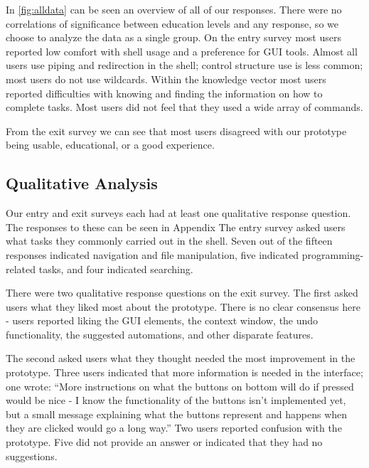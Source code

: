 In \ref{fig:alldata} can be seen an overview of all of our responses. There were no
correlations of significance between education levels and any response, so we
choose to analyze the data as a single group. On the entry survey most users
reported low comfort with shell usage and a preference for GUI tools. Almost all
users use piping and redirection in the shell; control structure use is less
common; most users do not use wildcards. Within the knowledge vector most users
reported difficulties with knowing and finding the information on how to
complete tasks. Most users did not feel that they used a wide array of commands.

From the exit survey we can see that most users disagreed with our prototype
being usable, educational, or a good experience.

\subsection{Qualitative Analysis}

Our entry and exit surveys each had at least one qualitative response question.
The responses to these can be seen in Appendix
The entry survey asked users what tasks they commonly carried out in the shell.
Seven out of the fifteen responses indicated navigation and file manipulation,
five indicated programming-related tasks, and four indicated searching.

There were two qualitative response questions on the exit survey. The first
asked users what they liked most about the prototype. There is no clear
consensus here \-- users reported liking the GUI elements, the context window, the
undo functionality, the suggested automations, and other disparate features.

The second asked users what they thought needed the most improvement in the
prototype. Three users indicated that more information is needed in the
interface; one wrote: ``More instructions on what the buttons on bottom will do
if pressed would be nice \-- I know the functionality of the buttons isn't
implemented yet, but a small message explaining what the buttons represent and
happens when they are clicked would go a long way.'' Two users reported
confusion with the prototype. Five did not provide an answer or indicated that
they had no suggestions.

